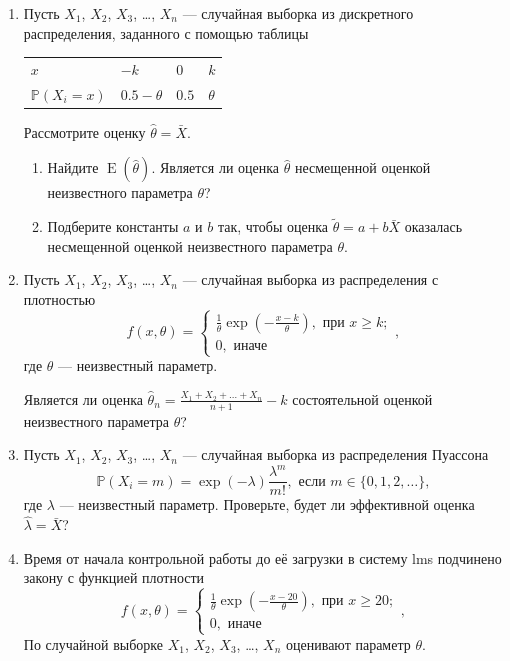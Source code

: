 \documentclass[12pt]{article}
\DeclareMathOperator{\E}{E}
\def \P{\mathbb{P}}
\begin{document}
\begin{enumerate}

\item  Пусть $X_1$, $X_2$, $X_3$, \ldots, $X_n$ — случайная выборка из дискретного распределения, 
заданного с помощью таблицы

\begin{tabular}{@{}llll@{}}
  \toprule
   $x$           & $-k$ & $0$ & $k$ \\ 
   $\P(X_i = x)$ & $0.5-\theta$ & $0.5$ & $\theta$ \\
  \bottomrule
\end{tabular}
			
Рассмотрите оценку $\hat \theta = \bar X$.
\begin{enumerate}
\item Найдите $\E(\hat \theta)$. 
Является ли оценка $\hat \theta$ несмещенной оценкой неизвестного параметра $\theta$?
\item Подберите константы $a$ и $b$ так, 
чтобы оценка $\tilde \theta = a + b\bar X$ оказалась несмещенной оценкой неизвестного параметра $\theta$.
\end{enumerate} 



\item Пусть $X_1$, $X_2$, $X_3$, \ldots, $X_n$ — случайная выборка из распределения с плотностью
\[
  f(x, \theta) = \begin{cases}
    \frac{1}{\theta}\exp\left(-\frac{x-k}{\theta}\right), \text{ при } x\geq k; \\
    0, \text{ иначе}
  \end{cases},    
\]
где $\theta$ — неизвестный параметр.

Является ли оценка $\hat\theta_n = \frac{X_1 + X_2 + \ldots + X_n}{n+1} - k$ состоятельной оценкой неизвестного параметра $\theta$?


\item Пусть $X_1$, $X_2$, $X_3$, \ldots, $X_n$ 
— случайная выборка из распределения Пуассона
\[
\P(X_i = m) = \exp(-\lambda)\frac{\lambda^m}{m!}, \text{ если } m \in \{0, 1, 2, \ldots\},
\]
где $\lambda$ — неизвестный параметр. 
Проверьте, будет ли эффективной оценка $\hat\lambda = \bar X$?


\item  Время от начала контрольной работы до её загрузки в систему lms  подчинено закону с функцией плотности
\[
  f(x, \theta) = \begin{cases}
    \frac{1}{\theta}\exp\left(-\frac{x-20}{\theta}\right), \text{ при } x\geq 20; \\
    0, \text{ иначе}
  \end{cases},    
\]
По случайной выборке $X_1$, $X_2$, $X_3$, \ldots, $X_n$ оценивают параметр $\theta$. 


\end{enumerate}
\end{document}
